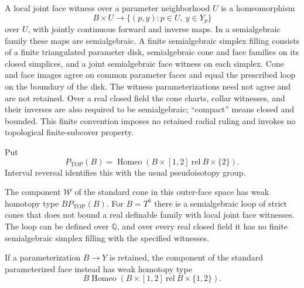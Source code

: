 A local joint face witness over a parameter neighborhood $U$ is a
homeomorphism
\[
 B\times U\longrightarrow
       \{(p,y):p\in U,\ y\in Y_p\}
\]
over $U$, with jointly continuous forward and inverse maps.
In a semialgebraic family these maps are semialgebraic.
A finite semialgebraic simplex filling consists of a finite
triangulated parameter disk, semialgebraic cone and face families
on its closed simplices, and a joint semialgebraic face witness
on each simplex.  Cone and face images agree on common parameter
faces and equal the prescribed loop on the boundary of the disk.
The witness parameterizations need not agree and are not retained.
Over a real closed field the cone charts, collar witnesses, and
their inverses are also required to be semialgebraic; ``compact''
means closed and bounded.  This finite convention imposes no
retained radial ruling and invokes no topological finite-subcover
property.

Put
\[
 P_{\mathrm{TOP}}(B)=
 \operatorname{Homeo}(B\times[1,2]\ \mathrm{rel}\ B\times\{2\}).
\]
Interval reversal identifies this with the usual pseudoisotopy group.

\begin{theorem}\label{thm:locally-parameterized-outer-faces}
The component $\mathcal W$ of the standard cone in this outer-face
space has weak homotopy type $BP_{\mathrm{TOP}}(B)$.
For $B=T^6$ there is a semialgebraic loop of strict cones that does
not bound a real definable family with local joint face witnesses.
The loop can be defined over $\mathbb Q$, and over every real closed
field it has no finite semialgebraic simplex filling with the
specified witnesses.

If a parameterization $B\to Y$ is retained, the component of the
standard parameterized face instead has weak homotopy type
\[
 B\operatorname{Homeo}
       (B\times[1,2]\ \mathrm{rel}\ B\times\{1,2\}).
\]
\end{theorem}

